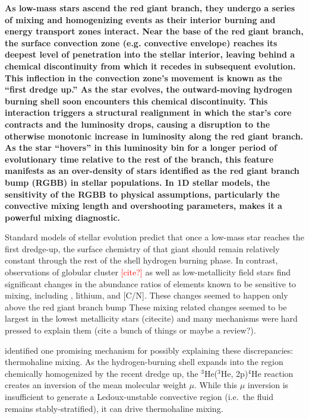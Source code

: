 \textbf{As low-mass stars ascend the red giant branch, they undergo a series of mixing and homogenizing events as their interior burning and energy transport zones interact. Near the base of the red giant branch, the surface convection zone (e.g. convective envelope) reaches its deepest level of penetration into the stellar interior, leaving behind a chemical discontinuity from which it recedes in subsequent evolution. This inflection in the convection zone's movement is known as the ``first dredge up.'' As the star evolves, the outward-moving hydrogen burning shell soon encounters this chemical discontinuity. This interaction triggers a structural realignment in which the star's core contracts and the luminosity drops, causing a disruption to the otherwise monotonic increase in luminosity along the red giant branch. As the star ``hovers'' in this luminosity bin for a longer period of evolutionary time relative to the rest of the branch, this feature manifests as an over-density of stars identified as the red giant branch bump (RGBB) in stellar populations. In 1D stellar models, the sensitivity of the RGBB to physical assumptions, particularly the convective mixing length and overshooting parameters, makes it a powerful mixing diagnostic.}

Standard models of stellar evolution predict that once a low-mass star reaches the first dredge-up,
the surface chemistry of that giant should remain relatively constant through the rest of the shell hydrogen burning phase. 
In contrast, observations of globular cluster \textcolor{red}{[cite?]} as well as low-metallicity field stars \citep{Gratton2000} find significant changes in the abundance ratios of elements known to be sensitive to mixing, including \ctwelvecthirteen, lithium, and [C/N]. 
These changes seemed to happen only above the red giant branch bump
These mixing related changes seemed to be largest in the lowest metallicity stars (citecite) and many mechanisms were hard pressed to explain them (cite a bunch of things or maybe a review?). 

\citet{charbonnel_thermohaline_2007} identified one promising mechanism for possibly explaining these discrepancies: thermohaline mixing. As the hydrogen-burning shell expands into the region chemically homogenized by the recent dredge up, the $^3$He($^3$He, 2p)$^4$He reaction creates an inversion of the mean molecular weight $\mu$. While this $\mu$ inversion is insufficient to generate a Ledoux-unstable convective region (i.e.~the fluid remains stably-stratified), it can drive thermohaline mixing. 

